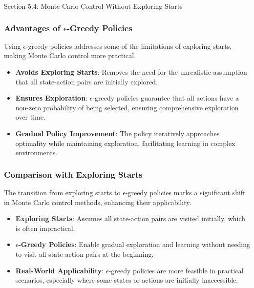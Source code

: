\begin{notes}{Section 5.4: Monte Carlo Control Without Exploring Starts}
\begin{highlight}
    \end{highlight}
    
    \subsubsection*{Advantages of $\epsilon$-Greedy Policies}
    
    Using $\epsilon$-greedy policies addresses some of the limitations of exploring starts, making Monte Carlo control more practical.
    
    \begin{highlight}
    
        \begin{itemize}
            \item \textbf{Avoids Exploring Starts}: Removes the need for the unrealistic assumption that all state-action pairs are initially explored.
            \item \textbf{Ensures Exploration}: $\epsilon$-greedy policies guarantee that all actions have a non-zero probability of being selected, ensuring comprehensive exploration over time.
            \item \textbf{Gradual Policy Improvement}: The policy iteratively approaches optimality while maintaining exploration, facilitating learning in complex environments.
        \end{itemize}
    
    \end{highlight}
    
    \subsubsection*{Comparison with Exploring Starts}
    
    The transition from exploring starts to $\epsilon$-greedy policies marks a significant shift in Monte Carlo control methods, enhancing their applicability.
    
    \begin{highlight}
    
        \begin{itemize}
            \item \textbf{Exploring Starts}: Assumes all state-action pairs are visited initially, which is often impractical.
            \item \textbf{$\epsilon$-Greedy Policies}: Enable gradual exploration and learning without needing to visit all state-action pairs at the beginning.
            \item \textbf{Real-World Applicability}: $\epsilon$-greedy policies are more feasible in practical scenarios, especially where some states or actions are initially inaccessible.
        \end{itemize}
    

\end{highlight}
\end{notes}

